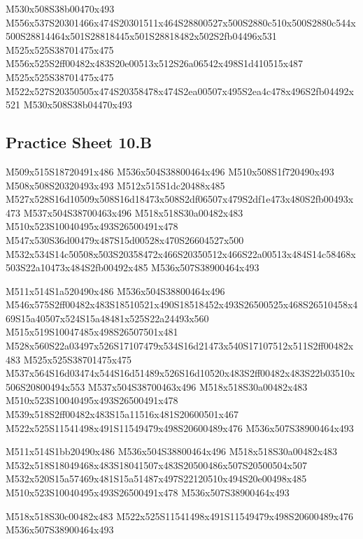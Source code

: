 \documentclass{article}
\begin{document}
\begin{multicols}{5}
\begin{center}
M530x508S38b00470x493 %
M556x537S20301466x474S20301511x464S28800527x500S2880c510x500S2880c544x500S28814464x501S28818445x501S28818482x502S2fb04496x531 %
M525x525S38701475x475 %
M556x525S2ff00482x483S20e00513x512S26a06542x498S1d410515x487 %
M525x525S38701475x475 %
M522x527S20350505x474S20358478x474S2ea00507x495S2ea4c478x496S2fb04492x521 %
M530x508S38b04470x493 %
\vfil

\end{center}
\end{multicols}

\subsection{Practice Sheet 10.B}

\begin{multicols}{5}
\begin{center}

M509x515S18720491x486 %
M536x504S38800464x496 %
M510x508S1f720490x493 %
M508x508S20320493x493 %
M512x515S1dc20488x485 %
M527x528S16d10509x508S16d18473x508S2df06507x479S2df1e473x480S2fb00493x473 %
M537x504S38700463x496 %
M518x518S30a00482x483 %
M510x523S10040495x493S26500491x478 %
M547x530S36d00479x487S15d00528x470S26604527x500 %
M532x534S14c50508x503S20358472x466S20350512x466S22a00513x484S14c58468x503S22a10473x484S2fb00492x485 %
M536x507S38900464x493 %
\vfil
\columnbreak

M511x514S1a520490x486 %
M536x504S38800464x496 %
M546x575S2ff00482x483S18510521x490S18518452x493S26500525x468S26510458x469S15a40507x524S15a48481x525S22a24493x560 %
M515x519S10047485x498S26507501x481 %
M528x560S22a03497x526S17107479x534S16d21473x540S17107512x511S2ff00482x483 %
M525x525S38701475x475 %
M537x564S16d03474x544S16d51489x526S16d10520x483S2ff00482x483S22b03510x506S20800494x553 %
M537x504S38700463x496 %
M518x518S30a00482x483 %
M510x523S10040495x493S26500491x478 %
M539x518S2ff00482x483S15a11516x481S20600501x467 %
M522x525S11541498x491S11549479x498S20600489x476 %
M536x507S38900464x493 %
\vfil
\columnbreak

M511x514S1bb20490x486 %
M536x504S38800464x496 %
M518x518S30a00482x483 %
M532x518S18049468x483S18041507x483S20500486x507S20500504x507 %
M532x520S15a57469x481S15a51487x497S22120510x494S20e00498x485 %
M510x523S10040495x493S26500491x478 %
M536x507S38900464x493 %

M518x518S30c00482x483 %
M522x525S11541498x491S11549479x498S20600489x476 %
M536x507S38900464x493 %
\vfil
\columnbreak


\end{center}
\end{multicols}
\end{document}
